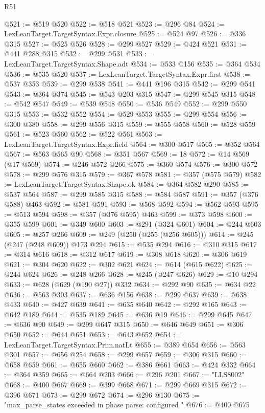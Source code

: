 \begin{lexlean}{R51}
\begin{coremodule}
@521 := @519 @520
@522 := @518 @521
@523 := @296 @84
@524 := LexLeanTarget.TargetSyntax.Expr.closure
@525 := @524 @97
@526 := @336 @315
@527 := @525 @526
@528 := @299 @527
@529 := @424 @521
@531 := @441 @288 @315
@532 := @299 @531
@533 := LexLeanTarget.TargetSyntax.Shape.adt
@534 := @533 @156
@535 := @364 @534
@536 := @535 @520
@537 := LexLeanTarget.TargetSyntax.Expr.first
@538 := @537 @353
@539 := @299 @538
@541 := @441 @196 @315
@542 := @299 @541
@543 := @364 @374
@545 := @543 @203 @315
@547 := @299 @545 @315
@548 := @542 @547
@549 := @539 @548
@550 := @536 @549
@552 := @299 @550 @315
@553 := @532 @552
@554 := @529 @553
@555 := @299 @554
@556 := @300 @380
@558 := @299 @556 @315
@559 := @555 @558
@560 := @528 @559
@561 := @523 @560
@562 := @522 @561
@563 := LexLeanTarget.TargetSyntax.Expr.field
@564 := @300 @517
@565 := @352 @564
@567 := @563 @565 @90
@568 := @351 @567
@569 := 18
@572 := @14 @569 (@17 @569)
@574 := @246 @572 @266
@575 := @360 @574
@576 := @300 @572
@578 := @299 @576 @315
@579 := @367 @578
@581 := @357 (@575 @579)
@582 := LexLeanTarget.TargetSyntax.Shape.ok
@584 := @364 @582 @290
@585 := @537 @564
@587 := @299 @585 @315
@588 := @584 @587
@591 := @357 (@376 @588) @463
@592 := @581 @591
@593 := @568 @592
@594 := @562 @593
@595 := @513 @594
@598 := @357 (@376 @595) @463
@599 := @373 @598
@600 := @355 @599
@601 := @349 @600
@603 := @291 (@324 @601)
@604 := @244 @603
@605 := @257 @266
@609 := @249 (@250 (@255 (@256 @605)))
@614 := @245 (@247 (@248 @609)) @173 @294
@615 := @535 @294
@616 := @310 @315
@617 := @314 @616
@618 := @312 @617
@619 := @308 @618
@620 := @306 @619
@621 := @304 @620
@622 := @302 @621
@624 := @614 (@615 @622)
@625 := @244 @624
@626 := @248 @266
@628 := @245 (@247 @626)
@629 := @10 @294
@633 := @628 (@629 (@190 @27)) @332
@634 := @292 @90
@635 := @634 @22
@636 := @563 @303
@637 := @636 @156
@638 := @299 @637
@639 := @638 @433
@640 := @427 @639
@641 := @635 @640
@642 := @292 @165
@643 := @642 @189
@644 := @535 @189
@645 := @636 @19
@646 := @299 @645
@647 := @636 @90
@649 := @299 @647 @315
@650 := @646 @649
@651 := @306 @650
@652 := @644 @651
@653 := @643 @652
@654 := LexLeanTarget.TargetSyntax.Prim.natLt
@655 := @389 @654
@656 := @563 @301
@657 := @656 @254
@658 := @299 @657
@659 := @306 @315
@660 := @658 @659
@661 := @655 @660
@662 := @386 @661
@663 := @424 @332
@664 := @364 @359
@665 := @664 @203
@666 := @296 @201
@667 := "LLS8002"
@668 := @400 @667
@669 := @399 @668
@671 := @299 @669 @315
@672 := @396 @671
@673 := @299 @672
@674 := @296 @130
@675 := "max_parse_states exceeded in phase parse: configured "
@676 := @400 @675

\end{coremodule}
\end{lexlean}
